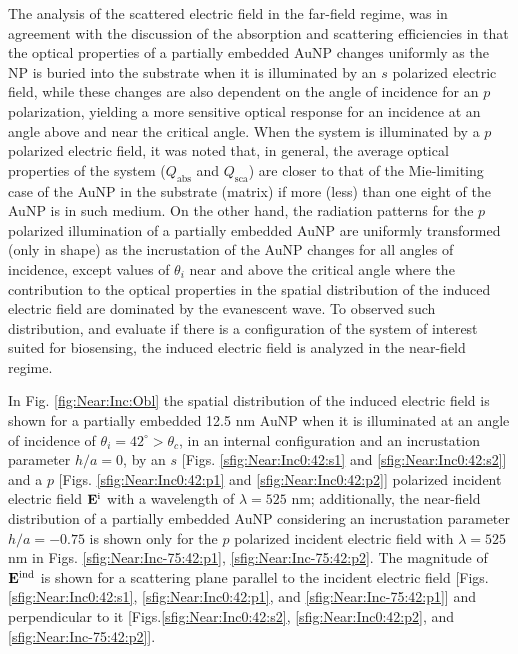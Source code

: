 The analysis of the scattered electric field in the far-field regime, was in agreement with the discussion of the absorption and scattering efficiencies in that the optical properties of a partially embedded AuNP changes uniformly as the NP is buried into the substrate when it is illuminated by an $s$ polarized electric field, while these changes are also dependent on the angle of incidence for an $p$ polarization, yielding a more sensitive optical response for an incidence at an angle above and near the critical angle. When the system is illuminated by a $p$ polarized electric field, it was noted that, in general, the average optical properties of the system ($Q_\text{abs}$ and $Q_\text{sca}$) are closer to that of the Mie-limiting case of the AuNP in the substrate (matrix) if more (less) than one eight of the AuNP is in such medium. On the other hand, the radiation patterns  for the $p$ polarized illumination of a partially embedded AuNP  are uniformly transformed (only in shape) as the incrustation of the AuNP changes for all angles of incidence, except values of $\theta_i$ near and above the critical angle where the contribution to the optical properties in the spatial distribution of the induced electric field are dominated by the evanescent wave. To observed such distribution, and evaluate if there is a configuration of the system of interest suited for biosensing, the induced electric field is analyzed in the near-field regime.

In Fig. \ref{fig:Near:Inc:Obl} the spatial distribution of the induced electric field is shown for a partially embedded 12.5 nm AuNP when it is illuminated at an angle of incidence of $\theta_i = 42^\circ>\theta_c$, in an internal configuration and an incrustation parameter $h/a = 0$, by an $s$ [Figs. \ref{sfig:Near:Inc0:42:s1} and \ref{sfig:Near:Inc0:42:s2}] and a $p$ [Figs. \ref{sfig:Near:Inc0:42:p1} and   \ref{sfig:Near:Inc0:42:p2}] polarized incident electric field $\vb{E}^\text{i}$ with a wavelength of $\lambda  =525$ nm; additionally, the near-field distribution of a partially embedded AuNP considering an incrustation parameter $h/a = -0.75$ is shown only for the $p$ polarized incident electric field with  $\lambda  =525$ nm in Figs. \ref{sfig:Near:Inc-75:42:p1},  \ref{sfig:Near:Inc-75:42:p2}.  The magnitude of $\vb{E}^\text{ind}$ is shown for a scattering plane parallel to the incident electric field [Figs. \ref{sfig:Near:Inc0:42:s1}, \ref{sfig:Near:Inc0:42:p1}, and  \ref{sfig:Near:Inc-75:42:p1}] and perpendicular to it [Figs.\ref{sfig:Near:Inc0:42:s2}, \ref{sfig:Near:Inc0:42:p2}, and \ref{sfig:Near:Inc-75:42:p2}].

